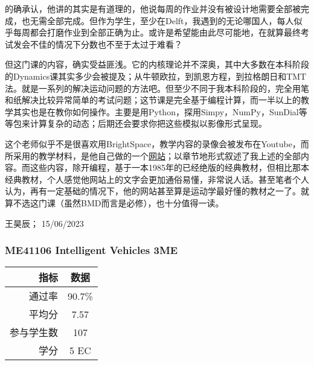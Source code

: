 的确承认，他讲的其实是有道理的，他说每周的作业并没有被设计地需要全部被完成，也无需全部完成。但作为学生，至少在Delft，我遇到的无论哪国人，每人似乎每周都会打磨作业到全部正确为止。或许是希望能由此尽可能地，在就算最终考试发会不佳的情况下分数也不至于太过于难看？

但这门课的内容，确实受益匪浅。它的内核理论并不深奥，其中大多数在本科阶段的Dynamics课其实多少会被提及；从牛顿欧拉，到凯恩方程，到拉格朗日和TMT法。就是一系列的解决运动问题的方法吧。但至少不同于我本科阶段的，完全用笔和纸解决比较异常简单的考试问题；这节课是完全基于编程计算，而一半以上的教学其实也是在教你如何操作。主要是用Python，探用Simpy，NumPy，SunDial等等包来计算复杂的动态；后期还会要求你把这些模拟以影像形式呈现。

这个老师似乎不是很喜欢用BrightSpace，教学内容的录像会被发布在Youtube，而所采用的教学材料，是他自己做的一个\href{https://moorepants.github.io/learn-multibody-dynamics/}{网站}；以章节地形式叙述了我上述的全部内容。而这些内容，除开编程，基于一本1985年的已经绝版的经典教材，但相比那本经典教材，个人感觉他网站上的文字会更加通俗易懂，非常说人话。甚至笔者个人认为，再有一定基础的情况下，他的网站甚至算是运动学最好懂的教材之一了。就算不选这门课（虽然BMD而言是必修），也十分值得一读。
\begin{flushright}
王昊辰； 15/06/2023
\end{flushright}

\subsubsection{ME41106 Intelligent Vehicles 3ME}
\begin{minipage}{0.45\textwidth}
\centering
{}
\end{minipage}%
\begin{minipage}{0.45\textwidth}
\raggedleft
\begin{tabular}{r|c}
\textbf{指标} & \textbf{数据} \\ \hline
通过率 & 90.7\% \\ 
平均分 & 7.57 \\ 
参与学生数 & 107 \\ 
学分 & 5 EC\\
\end{tabular}
\end{minipage}\\

